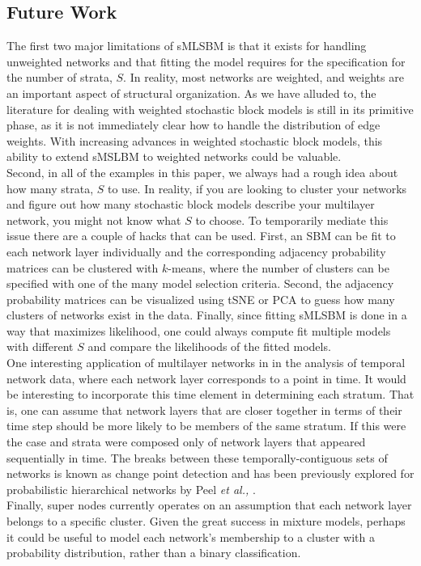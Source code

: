 \subsection{Future Work}
The first two major limitations of sMLSBM is that it exists for handling unweighted networks and that fitting the model requires for the specification for the number of strata, $S$. In reality, most networks are weighted, and weights are an important aspect of structural organization. As we have alluded to, the literature for dealing with weighted stochastic block models is still in its primitive phase, as it is not immediately clear how to handle the distribution of edge weights. With increasing advances in weighted stochastic block models, this ability to extend sMSLBM to weighted networks could be valuable.\\
\indent Second, in all of the examples in this paper, we always had a rough idea about how many strata, $S$ to use. In reality, if you are looking to cluster your networks and figure out how many stochastic block models describe your multilayer network, you might not know what $S$ to choose. To temporarily mediate this issue there are a couple of hacks that can be used. First, an SBM can be fit to each network layer individually and the corresponding adjacency probability matrices can be clustered with $k$-means, where the number of clusters can be specified with one of the many model selection criteria. Second, the adjacency probability matrices can be visualized using tSNE or PCA to guess how many clusters of networks exist in the data. Finally, since fitting sMLSBM is done in a way that maximizes likelihood, one could always compute fit multiple models with different $S$ and compare the likelihoods of the fitted models. \\
\indent One interesting application of multilayer networks in in the analysis of temporal network data, where each network layer corresponds to a point in time. It would be interesting to incorporate this time element in determining each stratum. That is, one can assume that network layers that are closer together in terms of their time step should be more likely to be members of the same stratum. If this were the case and strata were composed only of network layers that appeared sequentially in time. The breaks between these temporally-contiguous sets of networks is known as change point detection and has been previously explored for probabilistic hierarchical networks by Peel \emph{et al.,} \cite{peelChange}. \\
\indent Finally, super nodes currently operates on an assumption that each network layer belongs to a specific cluster. Given the great success in mixture models, perhaps it could be useful to model each network's membership to a cluster with a probability distribution, rather than a binary classification. 

